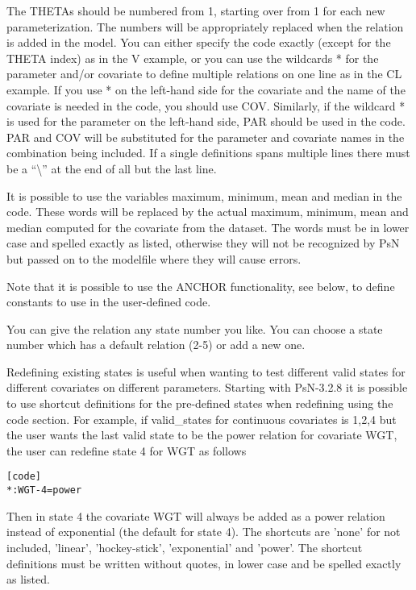 \documentclass[a4paper,12pt]{article}
\begin{document}
The THETAs should be numbered from 1, starting over from 1 for each new parameterization. The numbers will be appropriately replaced when the relation is added in the model. You can either specify the code exactly (except for the THETA index) as in the V example, or you can use the wildcards * for the parameter and/or covariate to define multiple relations on one line as in the CL example.  If you use * on the left-hand side for the covariate and the name of the covariate is needed in the code, you should use COV. Similarly, if the wildcard * is used for the parameter on the left-hand side, PAR should be used in the code. PAR and COV will be substituted for the parameter and covariate names in the combination being included. If a single definitions spans multiple lines there must be a  “\textbackslash” at the end of all but the last line.

It is possible to use the variables maximum, minimum, mean and median in the code. These words will be replaced by the actual maximum, minimum, mean and median computed for the covariate from the dataset. The words must be in lower case and spelled exactly as listed, otherwise they will not be recognized by PsN but passed on to the modelfile where they will cause errors. 

Note that it is possible to use the ANCHOR functionality, see below, to define constants to use in the user-defined code.

You can give the relation any state number you like. You can choose a state number which has a default relation (2-5) or add a new one. 

Redefining existing states is useful when wanting to test different valid states for different covariates on different parameters. Starting with PsN-3.2.8 it is possible to use shortcut definitions for the pre-defined states when redefining using the code section. For example, if valid\_states for continuous covariates is 1,2,4 but the user wants the last valid state to be the power relation for covariate WGT, the user can redefine state 4 for WGT as follows
\begin{verbatim}
[code]
*:WGT-4=power
\end{verbatim}
Then in state 4 the covariate WGT will always be added as a power relation instead of exponential (the default for state 4). The shortcuts are 'none' for not included, 'linear', 'hockey-stick', 'exponential' and 'power'. The shortcut definitions must be written without quotes, in lower case and be spelled exactly as listed. 
\end{document}
